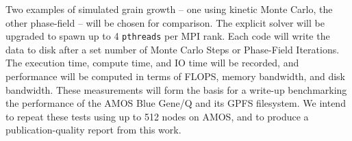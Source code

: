 \documentclass[11pt]{article}
\begin{document}
\begin{multicols}{2}
Two examples of simulated grain growth -- one using kinetic Monte Carlo, the other phase-field -- will be chosen for comparison.
The explicit solver will be upgraded to spawn up to 4 \texttt{pthreads} per MPI rank.
Each code will write the data to disk after a set number of Monte Carlo Steps or Phase-Field Iterations.
The execution time, compute time, and IO time will be recorded, and performance will be computed in terms of FLOPS, memory bandwidth, and disk bandwidth.
These measurements will form the basis for a write-up benchmarking the performance of the AMOS Blue Gene/Q and its GPFS filesystem.
We intend to repeat these tests using up to 512 nodes on AMOS, and to produce a publication-quality report from this work.
\end{multicols}
\label{LastPage}
\end{document}

